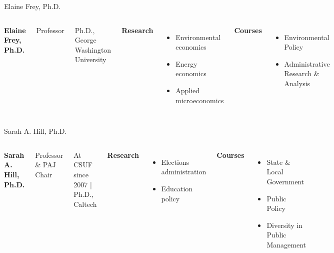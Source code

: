\documentclass[10pt,aspectratio=169]{beamer}
\begin{document}
\begin{frame}{Elaine Frey, Ph.D.}
\begin{columns}[T,onlytextwidth]
    \raggedright
    {\large\bfseries Elaine Frey, Ph.D.}\par
    {Professor}\par
    {\footnotesize Ph.D., George Washington University}\par\vspace{0.4em}

    \textbf{Research}
    \begin{itemize}
      \item Environmental economics
      \item Energy economics
      \item Applied microeconomics
    \end{itemize}

    \textbf{Courses}
    \begin{itemize}
      \item Environmental Policy
      \item Administrative Research \& Analysis
    \end{itemize}

    \vspace*{0.25cm}
\end{columns}
\end{frame}

\begin{frame}{Sarah A. Hill, Ph.D.}
\begin{columns}[T,onlytextwidth]
    \raggedright
    {\large\bfseries Sarah A. Hill, Ph.D.}\par
    {Professor \& PAJ Chair}\par
    {\footnotesize At CSUF since 2007 \quad | \quad Ph.D., Caltech}\par\vspace{0.4em}

    \textbf{Research}
    \begin{itemize}
      \item Elections administration
      \item Education policy
    \end{itemize}

    \textbf{Courses}
    \begin{itemize}
      \item State \& Local Government
      \item Public Policy
      \item Diversity in Public Management
    \end{itemize}

    \vspace*{0.25cm}
\end{columns}
\end{frame}
\end{document}

